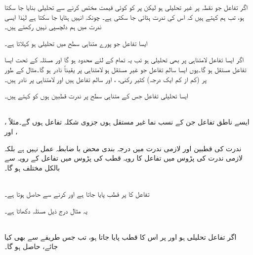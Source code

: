 اگر تفاعل  جو نقطہ  پر غیر تحلیلی ہو لیکن  پر  کو کوئی قیمت مختص کرنے سے تحلیلی بنایا جا سکتا ہو، تب ہم کہتے ہیں کہ اس کی ندرت ہٹائی جا سکتی ہے۔ چونکہ انہیں ہٹایا جا سکتا ہے لہٰذا ایسی ندرت میں ہم دلچسپی نہیں رکھتے ہیں۔

ایسا تفاعل جو پورے متناہی سطح میں تحلیلی ہو  کہلاتا ہے۔

اگر ایسا تفاعل لامتناہی پر بھی تحلیلی ہو تب یہ تمام  کے لئے محدود ہو گا اور مسئلہ  کے تحت ایسا تفاعل مستقل ہو گا۔یوں ایسا سالم تفاعل جو غیر مستقل ہو لامتناہی پر یقیناً  نادر ہو گا۔مثال کے طور پر (کم از کم ایک درجہ) کثیر رکنی، ،  اور  سالم تفاعل ہیں اور لامتناہی پر نادر ہیں۔

ایسا تحلیلی تفاعل جس کے متناہی سطح پر ندرت قطبین ہوں کو  کہتے ہیں۔

\quad {}\\
ایسے ناطق تفاعل جن  کے نسب نما غیر مستقل ہوں جزوی شکلہ تفاعل ہوں گے۔مثلاً ، ،  اور   

ندرت کی قطبین اور لازمی ندرت میں درجہ بندی محض با ضابطہ عمل نہیں ہے بلکہ لازمی ندرت کی پڑوس میں تفاعل کا رویہ قطب کی پڑوس میں تفاعل کے رویہ سے بالکل مختلف ہو گا۔

\quad {}\\
تفاعل  کا  پر قطب پایا جاتا ہے اور  کرنے سے  حاصل ہوتا ہے۔

یہ مثال درج ذیل مسئلہ  دکھاتا ہے۔

\quad {}\\
اگر تفاعل  تحلیلی ہو اور  پر  اس کا قطب  پایا جاتا ہو، تب جس طریقے سے بھی  کیا جائے،  حاصل ہو گا۔ 

